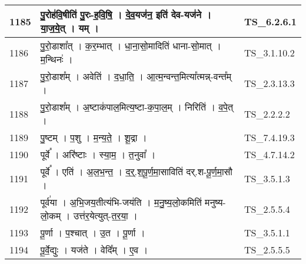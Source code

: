 \documentclass[17pt]{extarticle}
\begin{document}
\begin{longtable}{||p{0.4in}||p{4.9in}||p{0.9in}||}
    1185 & पु॒रोह॑वि॒षीति॑ पु॒रः{-}ह॒वि॒षि॒   ।   दे॒व॒यज॑न॒ इति॑ देव{-}यज॑ने   ।   या॒ज॒ये॒त्   ।   यम्   ।    & TS\_6.2.6.1       \\
    
    \hline
        
    1186 & पु॒रो॒डाशा᳚त्   ।   क॒र॒म्भात्   ।   धा॒ना॒सो॒मादिति॑ धाना{-}सो॒मात्   ।   म॒न्थिनः॑   ।    & TS\_3.1.10.2       \\
    
    \hline
        
    1187 & पु॒रो॒डाश᳚म्   ।   अवेति॑   ।   द॒धा॒ति॒   ।   आ॒त्म॒न्वन्त॒मित्या᳚त्मन्न्{-}वन्त᳚म्   ।    & TS\_2.3.13.3       \\
    
    \hline
        
    1188 & पु॒रो॒डाश᳚म्   ।   अ॒ष्टाक॑पाल॒मित्य॒ष्टा{-}क॒पा॒ल॒म्   ।   निरिति॑   ।   व॒पे॒त्   ।    & TS\_2.2.2.2       \\
    
    \hline
        
    1189 & पु॒ष्टम्   ।   प॒शु   ।   म॒न्य॒ते॒   ।   शू॒द्रा   ।    & TS\_7.4.19.3       \\
    
    \hline
        
    1190 & पूर्वे᳚   ।   अरि॑ष्टाः   ।   स्या॒म॒   ।   त॒नुवा᳚   ।    & TS\_4.7.14.2       \\
    
    \hline
        
    1191 & पूर्वे᳚   ।   एति॑   ।   अ॒ल॒भ॒न्त॒   ।   द॒र्॒.श॒पू॒र्ण॒मा॒साविति॑ दर्.श{-}पू॒र्ण॒मा॒सौ   ।    & TS\_3.5.1.3       \\
    
    \hline
        
    1192 & पूर्व॑या   ।   अ॒भि॒जय॒तीत्य॑भि{-}जय॑ति   ।   म॒नु॒ष्य॒लो॒कमिति॑ मनुष्य{-}लो॒कम्   ।   उत्त॑र॒येत्युत्{-}त॒र॒या॒   ।    & TS\_2.5.5.4       \\
    
    \hline
        
    1193 & पू॒र्णा   ।   प॒श्चात्   ।   उ॒त   ।   पू॒र्णा   ।    & TS\_3.5.1.1       \\
    
    \hline
        
    1194 & पू॒र्वे॒द्युः   ।   यज॑ते   ।   वेदि᳚म्   ।   ए॒व   ।    & TS\_2.5.5.5       \\
    
    \hline
        

\end{longtable}
\end{document}
